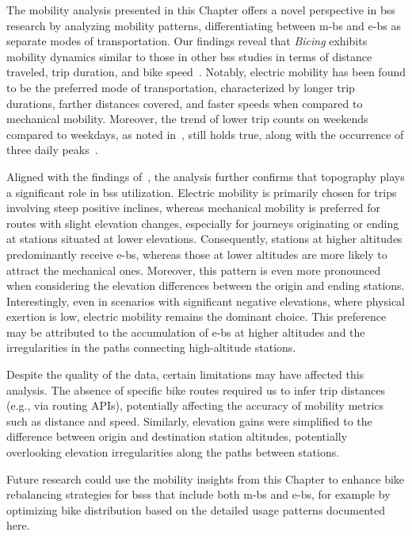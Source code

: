 The mobility analysis presented in this Chapter offers a novel perspective in \ac{bss} research by analyzing mobility patterns, differentiating between \acp{m-b} and \acp{e-b} as separate modes of transportation. Our findings reveal that \textit{Bicing} exhibits mobility dynamics similar to those in other \ac{bss} studies in terms of distance traveled, trip duration, and bike speed~\cite{Jensen2010, Ciancia2015, Zaltz2013, Chiariotti2018, Borgnat2011, Zhang2016Bicycle}. Notably, electric mobility has been found to be the preferred mode of transportation, characterized by longer trip durations, farther distances covered, and faster speeds when compared to mechanical mobility. Moreover, the trend of lower trip counts on weekends compared to weekdays, as noted in~\cite{Froehlich2009, Bustamante2022}, still holds true, along with the occurrence of three daily peaks~\cite{Froehlich2009}. 

Aligned with the findings of~\cite{Morency2015, Kim2020}, the analysis further confirms that topography plays a significant role in \ac{bss} utilization. Electric mobility is primarily chosen for trips involving steep positive inclines, whereas mechanical mobility is preferred for routes with slight elevation changes, especially for journeys originating or ending at stations situated at lower elevations. Consequently, stations at higher altitudes predominantly receive \acp{e-b}, whereas those at lower altitudes are more likely to attract the mechanical ones. Moreover, this pattern is even more pronounced when considering the elevation differences between the origin and ending stations. Interestingly, even in scenarios with significant negative elevations, where physical exertion is low, electric mobility remains the dominant choice. This preference may be attributed to the accumulation of \acp{e-b} at higher altitudes and the irregularities in the paths connecting high-altitude stations.

Despite the quality of the data, certain limitations may have affected this analysis. The absence of specific bike routes required us to infer trip distances (e.g., via routing APIs), potentially affecting the accuracy of mobility metrics such as distance and speed. Similarly, elevation gains were simplified to the difference between origin and destination station altitudes, potentially overlooking elevation irregularities along the paths between stations.

Future research could use the mobility insights from this Chapter to enhance bike rebalancing strategies for \acp{bss} that include both \acp{m-b} and \acp{e-b}, for example by optimizing bike distribution based on the detailed usage patterns documented here.